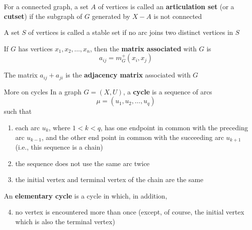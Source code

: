 \documentclass[aspectratio=43]{beamer}
\begin{document}
\begin{frame} 
\begin{definition}
For a connected graph, a set $A$ of vertices is called an \textbf{articulation set} (or a \textbf{cutset}) if the subgraph of $G$ generated by $X-A$ is not connected
\end{definition}
\vfill
\begin{definition}
A set $S$ of vertices is called a stable set if no arc joins two distinct vertices in $S$
\end{definition}
\vfill
\begin{definition}
If $G$ has vertices $x_1,x_2,\ldots,x_n$, then the \textbf{matrix associated} with $G$ is 
\[
a_{ij}=m_G^+(x_i,x_j)
\]
\end{definition}
\vfill
\begin{definition}
The matrix $a_{ij}+a_{ji}$ is the \textbf{adjacency matrix} associated with $G$
\end{definition}
\end{frame}



\begin{frame}{More on cycles}
In a graph $G=(X,U)$, a \textbf{cycle} is a sequence of arcs
\[
\mu=(u_1,u_2,\ldots,u_q)
\]
such that
\begin{enumerate}
\item each arc $u_k$, where $1 < k < q$, has one endpoint in common with the
preceding arc $u_{k-1}$, and the other end point in common with the succeeding
arc $u_{k+1}$ (i.e., this sequence is a chain)
\item the sequence does not use the same arc twice
\item the initial vertex and terminal vertex of the chain are the same
\end{enumerate}
An \textbf{elementary cycle} is a cycle in which, in addition,
\begin{enumerate}\setcounter{enumi}{3}
\item no vertex is encountered more than once (except, of course, the initial
vertex which is also the terminal vertex)
\end{enumerate}
\end{frame}
\end{document}
